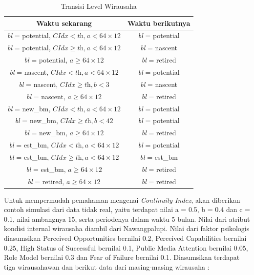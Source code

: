 \begin{table}[H]
\centering
\caption{Transisi Level Wirausaha}
\begin{tabular}{|c|c|}
\hline
Waktu sekarang & Waktu berikutnya \\
\hline
\textit{bl} = potential, $ \textit{CIdx} < \textit{th}, \textit{a} < 64 \times 12$ & \textit{bl} = potential \\
\hline
\textit{bl} = potential, $\textit{CIdx} \geq \textit{th}, \textit{a} < 64 \times 12$ & \textit{bl} = nascent \\
\hline
\textit{bl} = potential, $\textit{a} \geq 64 \times 12$ & \textit{bl} = retired \\
\hline
\textit{bl} = nascent, $\textit{CIdx} < \textit{th}, \textit{a} <64 \times 12$ & \textit{bl} = potential \\
\hline
\textit{bl} = nascent, $\textit{CIdx} \geq \textit{th}, \textit{b} < 3$ & \textit{bl} = nascent \\
\hline
\textit{bl} = nascent, $\textit{a} \geq 64 \times 12$ & \textit{bl} = retired \\
\hline
\textit{bl} = new\_bm, $\textit{CIdx} < \textit{th}, \textit{a} < 64 \times 12$ & \textit{bl} = potential \\
\hline
\textit{bl} = new\_bm, $\textit{CIdx} \geq \textit{th}, \textit{b} < 42$ & \textit{bl} = potential \\
\hline
\textit{bl} = new\_bm, $\textit{a} \geq 64 \times 12$ & \textit{bl} = retired \\
\hline
\textit{bl} = est\_bm, $\textit{CIdx} < \textit{th}, \textit{a} < 64 \times 12$ & \textit{bl} = potential \\
\hline
\textit{bl} = est\_bm, $\textit{CIdx} \geq \textit{th}, \textit{a} < 64 \times 12$ & \textit{bl} = est\_bm \\
\hline
\textit{bl} = est\_bm, $\textit{a} \geq 64 \times 12$ & \textit{bl} = retired \\
\hline
\textit{bl} = retired, $\textit{a} \geq 64 \times 12$ & \textit{bl} = retired \\
\hline
\end{tabular}
\label{tabelLW}
\end{table}


Untuk mempermudah pemahaman mengenai \textit{Continuity Index}, akan diberikan contoh simulasi dari data tidak real, yaitu terdapat nilai a = 0.5, b = 0.4 dan c = 0.1, nilai ambangnya 15, serta periodenya dalam waktu 5 bulan. Nilai dari atribut kondisi internal wirausaha diambil dari Nawangpalupi\cite{GEM2013}. Nilai dari faktor psikologis diasumsikan Perceived Opportunities bernilai 0.2, Perceived Capabilities bernilai 0.25, High Status of Successful bernilai 0.1, Public Media Attention bernilai 0.05, Role Model bernilai 0.3 dan Fear of Failure bernilai 0.1. Diasumsikan terdapat tiga wirausahawan dan berikut data dari masing-masing wirausaha :
				
